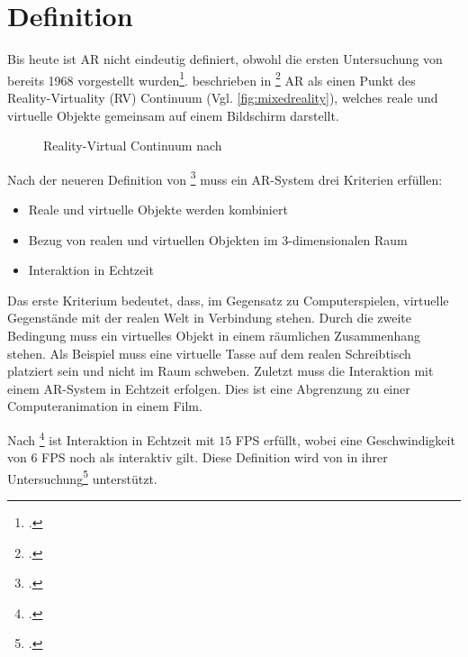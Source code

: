 \section{Definition} %
\label{sec:definition}
\begin{comment}
	Definiere Begriffe der Augmented Reality und Bildverarbeitung, die dem Leser nicht geläufig sind. Denke dabei an Prof. Klocke als Leser ohne besonderen Kenntnisstand in der AR/Bildverarbeitung.

	Azuma Definition der AR
	Milgram + Kishino MR oder nur Milgram Definition MR
\end{comment}

Bis heute ist \gls{AR} nicht eindeutig definiert, obwohl die ersten Untersuchung von \citeauthor{sutherland} bereits
 1968 vorgestellt wurden\footcite{sutherland}. \citeauthor{milgram94b} beschrieben in
 \footcite{milgram94b} \gls{AR} als einen Punkt des Reality-Virtuality (RV) Continuum
 (Vgl. \autoref{fig:mixedreality}), welches reale und virtuelle Objekte gemeinsam auf einem Bildschirm darstellt.
\begin{figure}[!ht]
	\centering
	
	\caption{Reality-Virtual Continuum nach \citeauthor{milgram94b}}
	\label{fig:mixedreality}
\end{figure}

Nach der neueren Definition von \citeauthor{azuma97}\footcite{azuma97} muss ein \gls{AR}-System drei Kriterien
 erfüllen:
\begin{itemize}
	\item Reale und virtuelle Objekte werden kombiniert
	\item Bezug von realen und virtuellen Objekten im 3-dimensionalen Raum
	\item Interaktion in Echtzeit
\end{itemize}
Das erste Kriterium bedeutet, dass, im Gegensatz zu Computerspielen, virtuelle Gegenstände mit der realen Welt in
 Verbindung stehen. Durch die zweite Bedingung muss ein virtuelles Objekt in einem räumlichen Zusammenhang stehen. Als
 Beispiel muss eine virtuelle Tasse auf dem realen Schreibtisch platziert sein und nicht im Raum schweben. Zuletzt muss
 die Interaktion mit einem \gls{AR}-System in Echtzeit erfolgen. Dies ist eine Abgrenzung zu einer Computeranimation in
 einem Film.

Nach \citeauthor{moeller2008}\footcite[Vgl.][S.~1]{moeller2008} ist Interaktion in Echtzeit mit $15$ FPS erfüllt, wobei
 eine Geschwindigkeit von $6$ FPS noch als interaktiv gilt. Diese Definition wird von \citeauthor{wagner09b} in ihrer
 Untersuchung\footcite[Vgl.][S.~8--9]{wagner09b} unterstützt.

